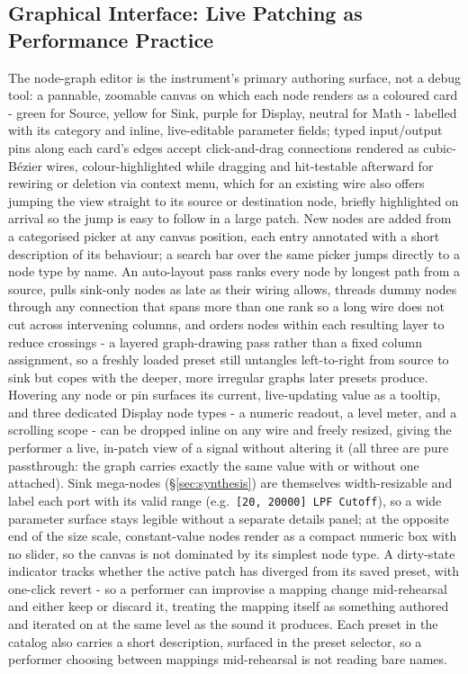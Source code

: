 \documentclass[sigconf,nonacm]{acmart}
\begin{document}
\subsection{Graphical Interface: Live Patching as Performance Practice}
\label{sec:live-patching}
The node-graph editor is the instrument's primary authoring surface, not a debug tool: a pannable,
zoomable canvas on which each node renders as a coloured card - green for Source,
yellow for Sink, purple for Display, neutral for Math - labelled with its category and inline,
live-editable parameter fields; typed input/output pins along each card's edges accept
click-and-drag connections rendered as cubic-B\'ezier wires, colour-highlighted while dragging and
hit-testable afterward for rewiring or deletion via context menu, which for an existing wire also
offers jumping the view straight to its source or destination node, briefly highlighted on arrival
so the jump is easy to follow in a large patch. New nodes are added from a categorised picker at any
canvas position, each entry annotated with a short description of its behaviour; a search bar
over the same picker jumps directly to a node type by name. An auto-layout pass ranks every node by
longest path from a source, pulls sink-only nodes as late as their wiring allows, threads
dummy nodes through any connection that spans more than one rank so a long wire does not cut across
intervening columns, and orders nodes within each resulting layer to reduce crossings - a layered
graph-drawing pass rather than a fixed column assignment, so a freshly loaded preset still untangles
left-to-right from source to sink but copes with the deeper, more irregular graphs later presets
produce. Hovering any node or pin surfaces its
current, live-updating value as a tooltip, and three dedicated Display node types - a numeric
readout, a level meter, and a scrolling scope - can be dropped inline on any wire and freely
resized, giving the performer a live, in-patch view of a signal without altering it (all three are
pure passthrough: the graph carries exactly the same value with or without one attached). Sink
mega-nodes (\S\ref{sec:synthesis}) are themselves width-resizable and label each port with its valid
range (e.g.\ \texttt{[20, 20000] LPF Cutoff}), so a wide parameter surface stays legible without a
separate details panel; at the opposite end of the size scale, constant-value nodes render as a
compact numeric box with no slider, so the canvas is not dominated by its simplest node type. A
dirty-state indicator tracks whether the active patch has diverged from its saved preset, with
one-click revert - so a performer can improvise a mapping change mid-rehearsal and either keep or
discard it, treating the mapping itself as something authored and iterated on at the same level as
the sound it produces. Each preset in the catalog also carries a short description,
surfaced in the preset selector, so a performer choosing between mappings mid-rehearsal is not
reading bare names.
\end{document}

